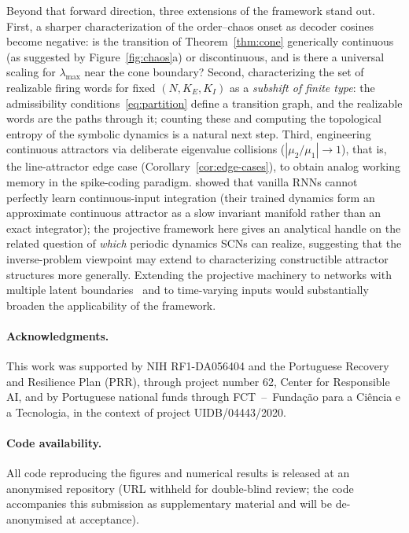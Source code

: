 \documentclass[12pt]{article}
\begin{document}
Beyond that forward direction, three extensions of the framework stand out. First, a sharper characterization of the order--chaos onset as decoder cosines become negative: is the transition of Theorem~\ref{thm:cone} generically continuous (as suggested by Figure~\ref{fig:chaos}a) or discontinuous, and is there a universal scaling for $\lambda_{\max}$ near the cone boundary? Second, characterizing the set of realizable firing words for fixed $(N,K_E,K_I)$ as a \emph{subshift of finite type}: the admissibility conditions~\eqref{eq:partition} define a transition graph, and the realizable words are the paths through it; counting these and computing the topological entropy of the symbolic dynamics is a natural next step. Third, engineering continuous attractors via deliberate eigenvalue collisions ($|\mu_2/\mu_1|\to 1$), that is, the line-attractor edge case (Corollary~\ref{cor:edge-cases}), to obtain analog working memory in the spike-coding paradigm. \citet{Sagodi2024a} showed that vanilla RNNs cannot perfectly learn continuous-input integration (their trained dynamics form an approximate continuous attractor as a slow invariant manifold rather than an exact integrator); the projective framework here gives an analytical handle on the related question of \emph{which} periodic dynamics SCNs can realize, suggesting that the inverse-problem viewpoint may extend to characterizing constructible attractor structures more generally. Extending the projective machinery to networks with multiple latent boundaries~\citep{podlaski2024approximating} and to time-varying inputs would substantially broaden the applicability of the framework.

\paragraph{Acknowledgments.}
This work was supported by NIH RF1-DA056404 and the Portuguese Recovery and Resilience Plan (PRR), through project number 62, Center for Responsible AI, and by Portuguese national funds through FCT~--~Funda\c{c}\~ao para a Ci\^encia e a Tecnologia, in the context of project UIDB/04443/2020.

\paragraph{Code availability.}
All code reproducing the figures and numerical results is released at an anonymised repository (URL withheld for double-blind review; the code accompanies this submission as supplementary material and will be de-anonymised at acceptance).


\newpage



\newpage
\FloatBarrier


\end{document}
